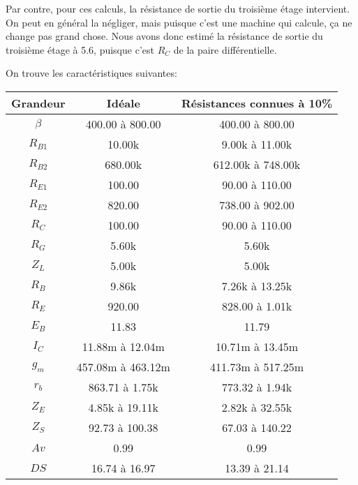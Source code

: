 \documentclass[11pt;a4paper]{report}
\begin{document}
    Par contre, pour ces calculs, la résistance de sortie du troisième étage intervient.
    On peut en général la négliger, mais puisque c’est une machine qui calcule, ça ne
    change pas grand chose. Nous avons donc estimé la résistance de sortie du troisième
    étage à 5.6\kilo\ohm, puisque c’est $R_C$ de la paire différentielle.

   On trouve les caractéristiques suivantes:

   \begin{tabular}{|c|c|c|}
    \hline
     Grandeur  & Idéale           &   Résistances connues à 10\% \\\hline
     $\beta$     & 400.00 à 800.00 & 400.00 à 800.00 \\\hline
     $R_{B1}$   &      10.00k      & 9.00k à 11.00k  \\\hline
     $R_{B2}$   &     680.00k      &612.00k à 748.00k\\\hline
     $R_{E1}$   &      100.00      & 90.00 à 110.00  \\\hline
     $R_{E2}$   &      820.00      & 738.00 à 902.00 \\\hline
     $R_C$       &      100.00      & 90.00 à 110.00  \\\hline
     $R_G$       &      5.60k       &      5.60k       \\\hline
     $Z_L$       &      5.00k       &      5.00k       \\\hline
     $R_B$       &      9.86k       & 7.26k à 13.25k  \\\hline
     $R_E$       &      920.00      & 828.00 à 1.01k  \\\hline
     $E_B$       &      11.83       &      11.79       \\\hline
     $I_C$       & 11.88m à 12.04m & 10.71m à 13.45m \\\hline
     $g_m$       &457.08m à 463.12m&411.73m à 517.25m\\\hline
     $r_b$       & 863.71 à 1.75k  & 773.32 à 1.94k  \\\hline
     $Z_E$       & 4.85k à 19.11k  & 2.82k à 32.55k  \\\hline
     $Z_S$       & 92.73 à 100.38  & 67.03 à 140.22  \\\hline
     $Av$        &       0.99       &       0.99       \\\hline
     $DS$         &  16.74 à 16.97  &  13.39 à 21.14  \\\hline
  \end{tabular}
\end{document}
